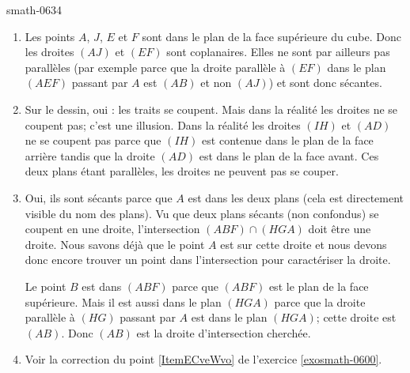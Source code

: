 
\begin{corrige}{smath-0634}

    \begin{enumerate}
        \item
            Les points \( A\), \( J\), \( E\) et \( F\) sont dans le plan de la face supérieure du cube. Donc les droites \( (AJ)\) et \( (EF)\) sont coplanaires. Elles ne sont par ailleurs pas parallèles (par exemple parce que la droite parallèle à \( (EF)\) dans le plan \( (AEF)\) passant par \( A\) est \( (AB)\) et non \( (AJ)\)) et sont donc sécantes.
        \item
            Sur le dessin, oui : les traits se coupent. Mais dans la réalité les droites ne se coupent pas; c'est une illusion. Dans la réalité les droites \( (IH)\) et \( (AD)\) ne se coupent pas parce que \( (IH)\) est contenue dans le plan de la face arrière tandis que la droite \( (AD)\) est dans le plan de la face avant. Ces deux plans étant parallèles, les droites ne peuvent pas se couper.
        \item
            Oui, ils sont sécants parce que \( A\) est dans les deux plans (cela est directement visible du nom des plans). Vu que deux plans sécants (non confondus) se coupent en une droite, l'intersection \( (ABF)\cap (HGA)\) doit être une droite. Nous savons déjà que le point \( A\) est sur cette droite et nous devons donc encore trouver un point dans l'intersection pour caractériser la droite.

            Le point \( B\) est dans \( (ABF)\) parce que \( (ABF)\) est le plan de la face supérieure. Mais il est aussi dans le plan \( (HGA)\) parce que la droite parallèle à \( (HG)\) passant par \( A\) est dans le plan \( (HGA)\); cette droite est \( (AB)\). Donc \( (AB)\) est la droite d'intersection cherchée.
        \item
            Voir la correction du point \ref{ItemECveWvo} de l'exercice \ref{exosmath-0600}.
    \end{enumerate}

\end{corrige}
